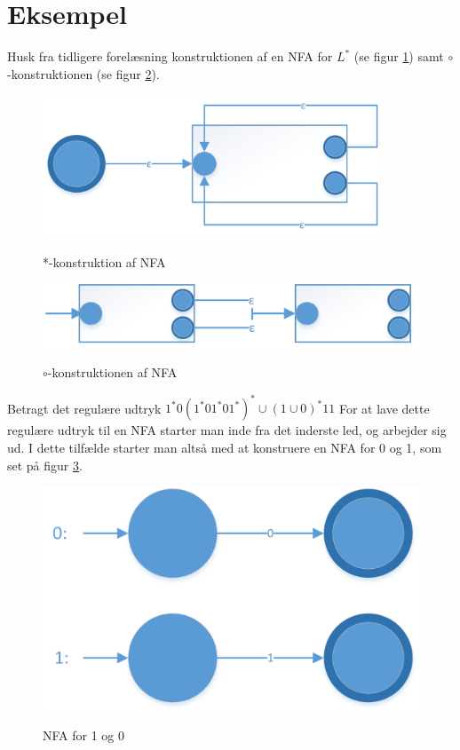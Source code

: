 \documentclass[a4paper,10pt,article]{memoir}
\begin{document}
\section{Eksempel}
Husk fra tidligere forelæsning konstruktionen af en NFA for $L^*$ (se figur \ref{fig:fig2}) samt $\circ$-konstruktionen (se figur \ref{fig:fig3}).

\begin{figure}[h]%
\centering
\includegraphics[width=100mm]{Fig2x.png}
\label{fig:fig2}
\caption{*-konstruktion af NFA}
\end{figure}

\begin{figure}[h]%
\centering
\includegraphics[width=\textwidth]{Fig3x.png}
\label{fig:fig3}
\caption{$\circ$-konstruktionen af NFA}
\end{figure}

Betragt det regulære udtryk $1^*0(1^*01^*01^*)^*  \cup (1 \cup 0)^*11$
For at lave dette regulære udtryk til en NFA starter man inde fra det inderste led, og arbejder sig ud. I dette tilfælde starter man altså med at konstruere en NFA for 0 og 1, som set på figur \ref{fig:fig4}.

\begin{figure}[h]%
\centering
\includegraphics[width=\textwidth]{Fig4x.png}
\label{fig:fig4}
\caption{NFA for 1 og 0}
\end{figure}
\end{document}
